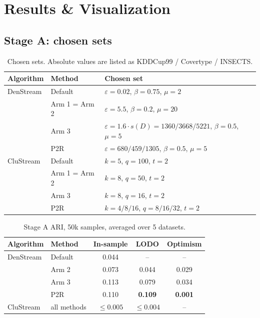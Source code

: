 \section{Results \& Visualization}

\subsection{Stage A: chosen sets}

\begin{table}[H]
\centering
\caption{Chosen sets. Absolute values are listed as KDDCup99 / Covertype / INSECTS.}
\label{tab:sets}
\footnotesize
\begin{tabularx}{\textwidth}{@{}l l L@{}}
\toprule
\textbf{Algorithm} & \textbf{Method} & \textbf{Chosen set} \\
\midrule
DenStream & Default       & $\varepsilon=0.02$, $\beta=0.75$, $\mu=2$ \\
          & Arm 1 = Arm 2 & $\varepsilon=5.5$, $\beta=0.2$, $\mu=20$ \\
          & Arm 3         & $\varepsilon=1.6\cdot s(D) = 1360 / 3668 / 5221$, $\beta=0.5$, $\mu=5$ \\
          & P2R           & $\varepsilon = 680 / 459 / 1305$, $\beta=0.5$, $\mu=5$ \\
\midrule
CluStream & Default       & $k=5$, $q=100$, $t=2$ \\
          & Arm 1 = Arm 2 & $k=8$, $q=50$, $t=2$ \\
          & Arm 3         & $k=8$, $q=16$, $t=2$ \\
          & P2R           & $k=4/8/16$, $q=8/16/32$, $t=2$ \\
\bottomrule
\end{tabularx}
\end{table}

\begin{table}[H]
\centering
\caption{Stage A ARI, 50k samples, averaged over 5 datasets.}
\label{tab:phaseA}
\small
\begin{tabular}{@{}l l c c c@{}}
\toprule
\textbf{Algorithm} & \textbf{Method} & \textbf{In-sample} & \textbf{LODO} & \textbf{Optimism} \\
\midrule
DenStream & Default & 0.044 & --    & --    \\
          & Arm 2   & 0.073 & 0.044 & 0.029 \\
          & Arm 3   & 0.113 & 0.079 & 0.034 \\
          & P2R     & 0.110 & \textbf{0.109} & \textbf{0.001} \\
\midrule
CluStream & all methods & $\le 0.005$ & $\le 0.004$ & -- \\
\bottomrule
\end{tabular}
\end{table}


